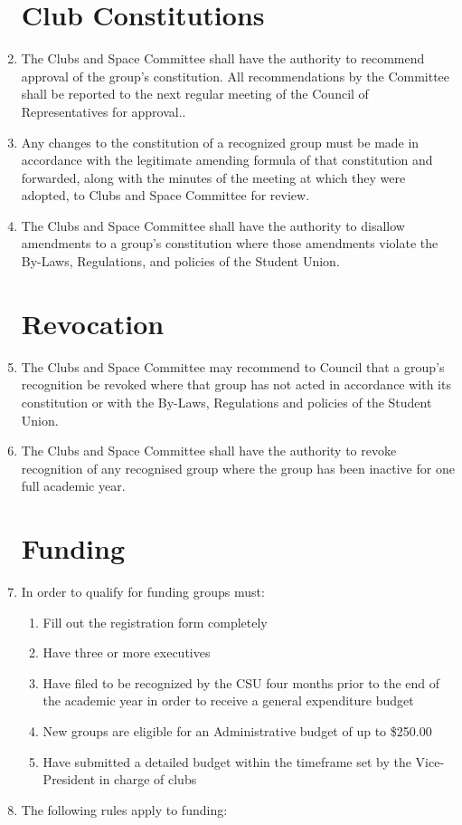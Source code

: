 \documentclass[oneside]{book}
\begin{document}
\begin{enumerate}
\section{\label{Club_Constitutions}Club Constitutions }
\item The Clubs and Space Committee shall have the authority to recommend
approval of the group's constitution. All recommendations by the Committee
shall be reported to the next regular meeting of the Council of Representatives
for approval.. 
\item Any changes to the constitution of a recognized group must be made
in accordance with the legitimate amending formula of that constitution
and forwarded, along with the minutes of the meeting at which they
were adopted, to Clubs and Space Committee for review. 
\item The Clubs and Space Committee shall have the authority to disallow
amendments to a group's constitution where those amendments violate
the By-Laws, Regulations, and policies of the Student Union. 

\section{\label{Revocation}Revocation }
\item The Clubs and Space Committee may recommend to Council that a group's
recognition be revoked where that group has not acted in accordance
with its constitution or with the By-Laws, Regulations and policies
of the Student Union. 
\item The Clubs and Space Committee shall have the authority to revoke recognition
of any recognised group where the group has been inactive for one
full academic year. 

\section{\label{Funding}Funding }
\item In order to qualify for funding groups must: 

	\begin{enumerate}
	\item Fill out the registration form completely 
	\item Have three or more executives 
	\item Have filed to be recognized by the CSU four months prior to the end
	of the academic year in order to receive a general expenditure budget 
	\item New groups are eligible for an Administrative budget of up to \$250.00 
	\item Have submitted a detailed budget within the timeframe set by the Vice-President
	in charge of clubs 
	\end{enumerate}
\item The following rules apply to funding:


\end{enumerate}
\end{document}
